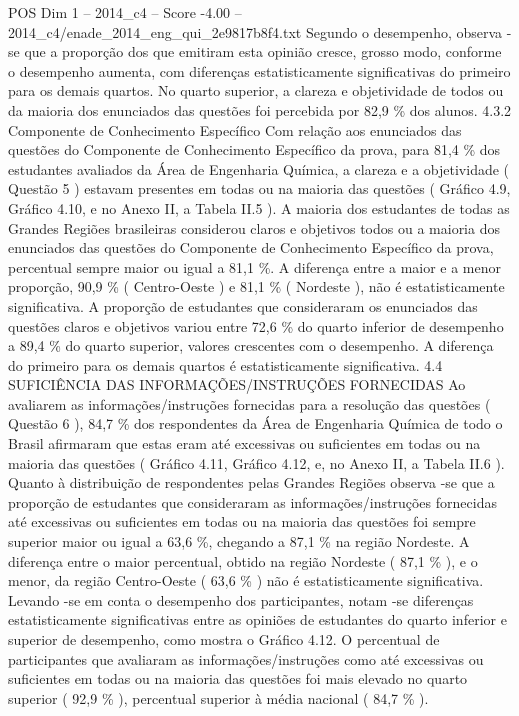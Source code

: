 \begin{textsample}{POS Dim 1 – 2014\_c4 – Score -4.00 – 2014\_c4/enade\_2014\_eng\_qui\_2e9817b8f4.txt}
Segundo o desempenho, observa -se que a proporção dos que emitiram esta opinião cresce, grosso modo, conforme o desempenho aumenta, com diferenças estatisticamente significativas do primeiro para os demais quartos.
No quarto superior, a clareza e objetividade de todos ou da maioria dos enunciados das questões foi percebida por 82,9 \% dos alunos. 4.3.2 Componente de Conhecimento Específico Com relação aos enunciados das questões do Componente de Conhecimento Específico da prova, para 81,4 \% dos estudantes avaliados da Área de Engenharia Química, a clareza e a objetividade ( Questão 5 ) estavam presentes em todas ou na maioria das questões ( Gráfico 4.9, Gráfico 4.10, e no Anexo II, a Tabela II.5 ).
A maioria dos estudantes de todas as Grandes Regiões brasileiras considerou claros e objetivos todos ou a maioria dos enunciados das questões do Componente de Conhecimento Específico da prova, percentual sempre maior ou igual a 81,1 \%.
A diferença entre a maior e a menor proporção, 90,9 \% ( Centro-Oeste ) e 81,1 \% ( Nordeste ), não é estatisticamente significativa.
A proporção de estudantes que consideraram os enunciados das questões claros e objetivos variou entre 72,6 \% do quarto inferior de desempenho a 89,4 \% do quarto superior, valores crescentes com o desempenho.
A diferença do primeiro para os demais quartos é estatisticamente significativa. 4.4 SUFICIÊNCIA DAS INFORMAÇÕES/INSTRUÇÕES FORNECIDAS Ao avaliarem as informações/instruções fornecidas para a resolução das questões ( Questão 6 ), 84,7 \% dos respondentes da Área de Engenharia Química de todo o Brasil afirmaram que estas eram até excessivas ou suficientes em todas ou na maioria das questões ( Gráfico 4.11, Gráfico 4.12, e, no Anexo II, a Tabela II.6 ).
Quanto à distribuição de respondentes pelas Grandes Regiões observa -se que a proporção de estudantes que consideraram as informações/instruções fornecidas até excessivas ou suficientes em todas ou na maioria das questões foi sempre superior maior ou igual a 63,6 \%, chegando a 87,1 \% na região Nordeste.
A diferença entre o maior percentual, obtido na região Nordeste ( 87,1 \% ), e o menor, da região Centro-Oeste ( 63,6 \% ) não é estatisticamente significativa.
Levando -se em conta o desempenho dos participantes, notam -se diferenças estatisticamente significativas entre as opiniões de estudantes do quarto inferior e superior de desempenho, como mostra o Gráfico 4.12.
O percentual de participantes que avaliaram as informações/instruções como até excessivas ou suficientes em todas ou na maioria das questões foi mais elevado no quarto superior ( 92,9 \% ), percentual superior à média nacional ( 84,7 \% ).

\end{textsample}
